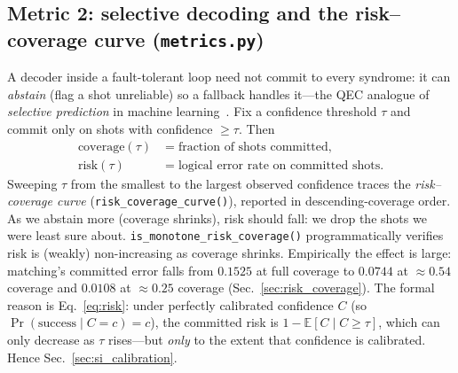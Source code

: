 \documentclass[reprint,aps,prxquantum,amsmath,amssymb,floatfix,nofootinbib,longbibliography]{revtex4-2}
\theoremstyle{definition}
\theoremstyle{remark}
\theoremstyle{plain}
\begin{document}
\subsection{Metric 2: selective decoding and the risk--coverage curve (\texttt{metrics.py})}
\label{sec:si_selective}
A decoder inside a fault-tolerant loop need not commit to every syndrome: it can \emph{abstain} (flag a shot unreliable) so a fallback handles it---the QEC analogue of \emph{selective prediction} in machine learning~\cite{chow1970optimum,geifman2017selective}. Fix a confidence threshold $\tau$ and commit only on shots with confidence $\ge\tau$. Then
\begin{align}
  \mathrm{coverage}(\tau) &= \text{fraction of shots committed},\\
  \mathrm{risk}(\tau)     &= \text{logical error rate on committed shots}.
\end{align}
Sweeping $\tau$ from the smallest to the largest observed confidence traces the \emph{risk--coverage curve} (\texttt{risk\_coverage\_curve()}), reported in descending-coverage order. As we abstain more (coverage shrinks), risk should fall: we drop the shots we were least sure about. \texttt{is\_monotone\_risk\_coverage()} programmatically verifies risk is (weakly) non-increasing as coverage shrinks. Empirically the effect is large: matching's committed error falls from $0.1525$ at full coverage to $0.0744$ at $\approx0.54$ coverage and $0.0108$ at $\approx0.25$ coverage (Sec.~\ref{sec:risk_coverage}). The formal reason is Eq.~\eqref{eq:risk}: under perfectly calibrated confidence $C$ (so $\Pr(\text{success}\mid C=c)=c$), the committed risk is $1-\mathbb{E}[C\mid C\ge\tau]$, which can only decrease as $\tau$ rises---but \emph{only} to the extent that confidence is calibrated. Hence Sec.~\ref{sec:si_calibration}.
\end{document}
